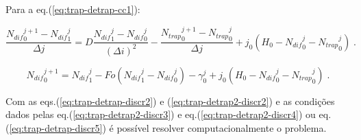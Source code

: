 Para a eq.(\ref{eq:trap-detrap-cc1}):

\begin{equation*}
\dfrac{{N_{dif}}_{0}^{j+1} - {N_{dif}}_{1}^{j}}{\Delta j} = D \dfrac{{N_{dif}}_{1}^{j} - {N_{dif}}_0^{j}}{(\Delta i)^2} - \dfrac{{N_{trap}}_0^{j+1} - {N_{trap}}_0^{j}}{\Delta j} + j_{0}\left(H_0-{N_{dif}}_0^{j}-{N_{trap}}_0^j\right)  \;.
\end{equation*} 

\begin{equation}
\label{eq:trap-detrap-discr5}
{N_{dif}}_{0}^{j+1} = {N_{dif}}_{1}^{j} - Fo({N_{dif}}_{1}^{j} - {N_{dif}}_0^{j}) - \gamma_0^j +j_{0}\left(H_0-{N_{dif}}_0^{j}-{N_{trap}}_0^j\right) \;.
\end{equation} 

Com as eqs.(\ref{eq:trap-detrap-discr2}) e (\ref{eq:trap-detrap2-discr2}) e as condições dados pelas eq.(\ref{eq:trap-detrap2-discr3}) e eq.(\ref{eq:trap-detrap2-discr4}) ou eq.(\ref{eq:trap-detrap-discr5}) é possível resolver computacionalmente o problema.